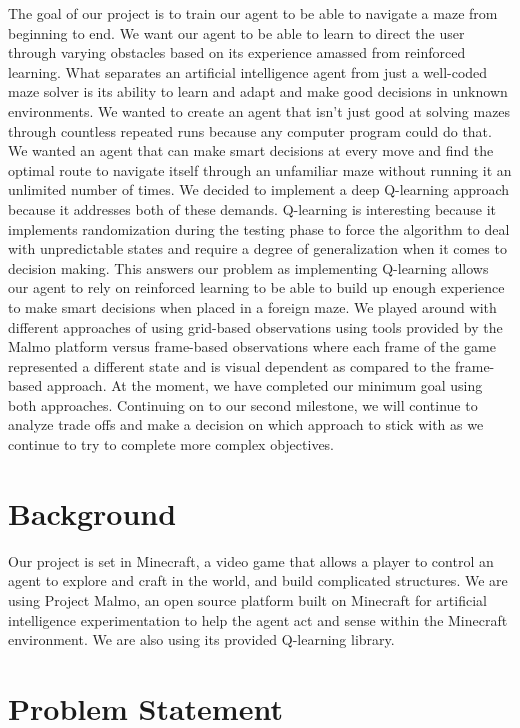 \documentclass{article}
\begin{document}
The goal of our project is to train our agent to be able to navigate a maze from beginning to end. We want our agent to be able to learn to direct the user through varying obstacles based on its experience amassed from reinforced learning. What separates an artificial intelligence agent from just a well-coded maze solver is its ability to learn and adapt and make good decisions in unknown environments. We wanted to create an agent that isn’t just good at solving mazes through countless repeated runs because any computer program could do that. We wanted an agent that can make smart decisions at every move and find the optimal route to navigate itself through an unfamiliar maze without running it an unlimited number of times. We decided to implement a deep Q-learning approach because it addresses both of these demands. Q-learning is interesting because it implements randomization during the testing phase to force the algorithm to deal with unpredictable states and require a degree of generalization when it comes to decision making. This answers our problem as implementing Q-learning allows our agent to rely on reinforced learning to be able to build up enough experience to make smart decisions when placed in a foreign maze. We played around with different approaches of using grid-based observations using tools provided by the Malmo platform versus frame-based observations where each frame of the game represented a different state and is visual dependent as compared to the frame-based approach. At the moment, we have completed our minimum goal using both approaches. Continuing on to our second milestone, we will continue to analyze trade offs and make a decision on which approach to stick with as we continue to try to complete more complex objectives. 

\section{Background}

Our project is set in Minecraft, a video game that allows a player to control an agent to explore and craft in the world, and build complicated structures. We are using Project Malmo, an open source platform built on Minecraft for artificial intelligence experimentation to help the agent act and sense within the Minecraft environment. We are also using its provided Q-learning library. 

\section{Problem Statement}
\end{document}
